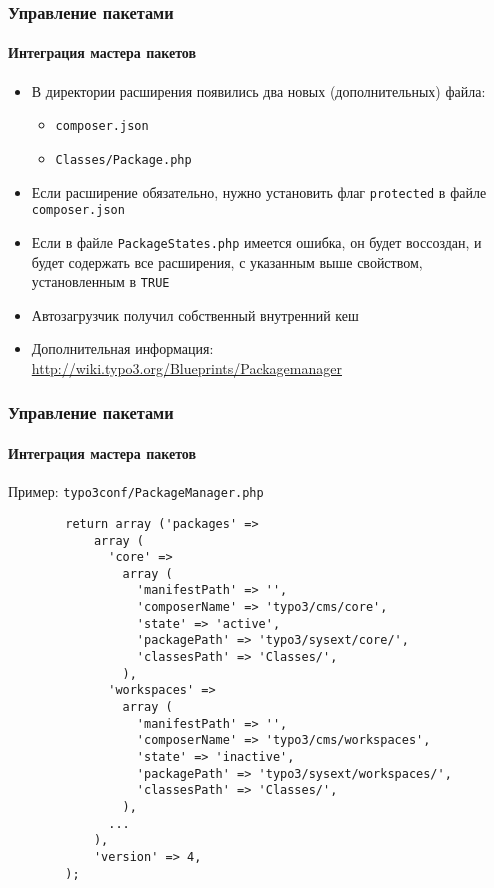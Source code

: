 \begin{frame}[fragile]
	\frametitle{Управление пакетами}
	\framesubtitle{Интеграция мастера пакетов}

	\begin{itemize}

		\item В директории расширения появились два новых (дополнительных) файла:

			\begin{itemize}
				\item \texttt{composer.json}
				\item \texttt{Classes/Package.php}
			\end{itemize}

		\item Если расширение обязательно, нужно установить флаг \texttt{protected} в файле \texttt{composer.json}

		\item Если в файле \texttt{PackageStates.php} имеется ошибка, он будет воссоздан,\newline
			и будет содержать все расширения, с указанным выше свойством, установленным в \texttt{TRUE}

		\item Автозагрузчик получил собственный внутренний кеш

		\item Дополнительная информация:\newline
			\url{http://wiki.typo3.org/Blueprints/Packagemanager}

	\end{itemize}

\end{frame}


\begin{frame}[fragile]
	\frametitle{Управление пакетами}
	\framesubtitle{Интеграция мастера пакетов}

	Пример: \texttt{typo3conf/PackageManager.php}

	\lstset{
		basicstyle=\tiny\ttfamily
	}

	\begin{lstlisting}
		return array ('packages' =>
		    array (
		      'core' =>
		        array (
		          'manifestPath' => '',
		          'composerName' => 'typo3/cms/core',
		          'state' => 'active',
		          'packagePath' => 'typo3/sysext/core/',
		          'classesPath' => 'Classes/',
		        ),
		      'workspaces' =>
		        array (
		          'manifestPath' => '',
		          'composerName' => 'typo3/cms/workspaces',
		          'state' => 'inactive',
		          'packagePath' => 'typo3/sysext/workspaces/',
		          'classesPath' => 'Classes/',
		        ),
		      ...
		    ),
		    'version' => 4,
		);
	\end{lstlisting}

\end{frame}

